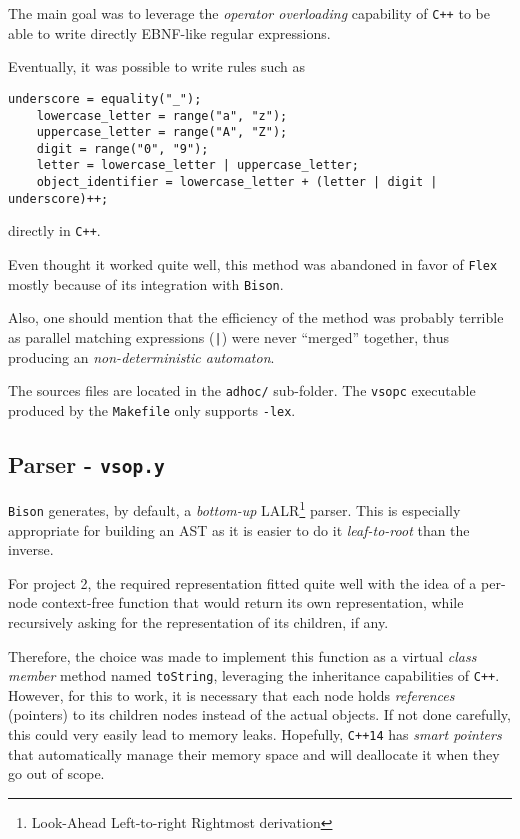 \documentclass[a4paper, 12pt]{article}
\begin{document}
	The main goal was to leverage the \emph{operator overloading} capability of \texttt{C++} to be able to write directly EBNF-like regular expressions.
	
	Eventually, it was possible to write rules such as
	
	\begin{lstlisting}[style=adhoc]
	underscore = equality("_");
	lowercase_letter = range("a", "z");
    uppercase_letter = range("A", "Z");
    digit = range("0", "9");
    letter = lowercase_letter | uppercase_letter;
    object_identifier = lowercase_letter + (letter | digit | underscore)++;
	\end{lstlisting}
	
	directly in \texttt{C++}.
	
	Even thought it worked quite well, this method was abandoned in favor of \texttt{Flex} mostly because of its integration with \texttt{Bison}.
	
	Also, one should mention that the efficiency of the method was probably terrible as parallel matching expressions (\lstinline[style=adhoc]{|}) were never \enquote{merged} together, thus producing an \emph{non-deterministic automaton}.
	
	\begin{note}
	The sources files are located in the \texttt{adhoc/} sub-folder. The \texttt{vsopc} executable produced by the \texttt{Makefile} only supports \texttt{-lex}.
	\end{note}
	
	\subsection{Parser - \texttt{vsop.y}}
	
	\texttt{Bison} generates, by default, a \emph{bottom-up} LALR\footnote{Look-Ahead Left-to-right Rightmost derivation} parser. This is especially appropriate for building an AST as it is easier to do it \emph{leaf-to-root} than the inverse.
	
	For project 2, the required representation fitted quite well with the idea of a per-node context-free function that would return its own representation, while recursively asking for the representation of its children, if any.
	
	Therefore, the choice was made to implement this function as a virtual \emph{class member} method named \texttt{toString}, leveraging the inheritance capabilities of \texttt{C++}. However, for this to work, it is necessary that each node holds \emph{references} (pointers) to its children nodes instead of the actual objects. If not done carefully, this could very easily lead to memory leaks. Hopefully, \texttt{C++14} has \emph{smart pointers} that automatically manage their memory space
	and will deallocate it when they go out of scope.
	
\end{document}
